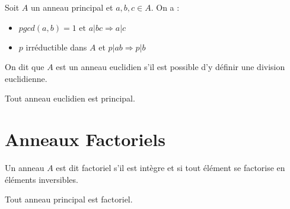 \begin{theorem}[Gauss]
    Soit $A$ un anneau principal et $a,b,c \in A$. On a :
    \begin{itemize}
        \item $ pgcd(a,b) = 1 \text{ et } a | bc \Longrightarrow a | c $ 
        \item $p$ irréductible dans $A$ et $ p | ab \Longrightarrow p | b $ 
    \end{itemize}
\end{theorem}

\begin{definition}
    On dit que $A$ est un anneau euclidien s'il est possible d'y définir une division euclidienne. 
\end{definition}

\begin{theorem}
    Tout anneau euclidien est principal. 
\end{theorem}



\section{Anneaux Factoriels}

\begin{definition}
    Un anneau $A$ est dit factoriel s'il est intègre et si tout élément se factorise en éléments inversibles. 
\end{definition}

\begin{theorem}
    Tout anneau principal est factoriel. 
\end{theorem}

